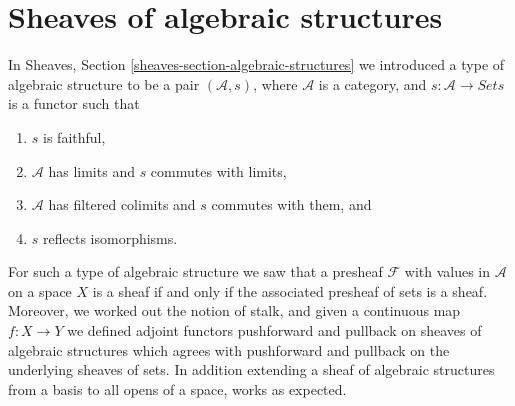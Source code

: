 \section{Sheaves of algebraic structures}
\label{section-sheaves-algebraic-structures}

\noindent
In Sheaves, Section \ref{sheaves-section-algebraic-structures}
we introduced a type of algebraic structure to be a pair
$(\mathcal{A}, s)$, where $\mathcal{A}$ is a category,
and $s : \mathcal{A} \to \textit{Sets}$ is a functor such
that
\begin{enumerate}
\item $s$ is faithful,
\item $\mathcal{A}$ has limits and $s$ commutes with limits,
\item $\mathcal{A}$ has filtered colimits and $s$ commutes with them, and
\item $s$ reflects isomorphisms.
\end{enumerate}
For such a type of algebraic structure we saw that a presheaf
$\mathcal{F}$ with values in $\mathcal{A}$ on a space $X$ is a sheaf if and
only if the associated presheaf of sets is a sheaf. Moreover,
we worked out the notion of stalk, and given a continuous map
$f : X \to Y$ we defined adjoint functors pushforward and pullback
on sheaves of algebraic structures which agrees with pushforward
and pullback on the underlying sheaves of sets. In addition extending
a sheaf of algebraic structures from a basis to all opens
of a space, works as expected.

